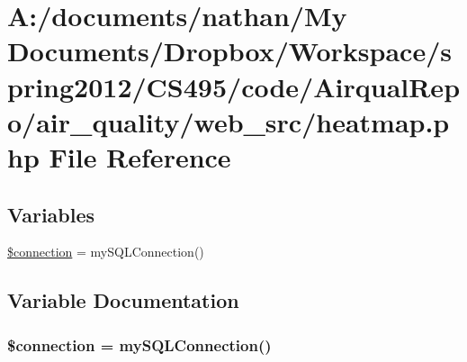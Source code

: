 \hypertarget{heatmap_8php}{\section{A\-:/documents/nathan/\-My Documents/\-Dropbox/\-Workspace/spring2012/\-C\-S495/code/\-Airqual\-Repo/air\-\_\-quality/web\-\_\-src/heatmap.php File Reference}
\label{heatmap_8php}
}
\subsection*{Variables}
\begin{DoxyCompactItemize}
\item 
\hyperlink{heatmap_8php_a0d9c79b9b86b3f5891c6d3892f12c6a0}{\$connection} = my\-S\-Q\-L\-Connection()
\end{DoxyCompactItemize}


\subsection{Variable Documentation}
\hypertarget{heatmap_8php_a0d9c79b9b86b3f5891c6d3892f12c6a0}{
\subsubsection[{\$connection}]{\setlength{\rightskip}{0pt plus 5cm}\$connection = my\-S\-Q\-L\-Connection()}}\label{heatmap_8php_a0d9c79b9b86b3f5891c6d3892f12c6a0}
